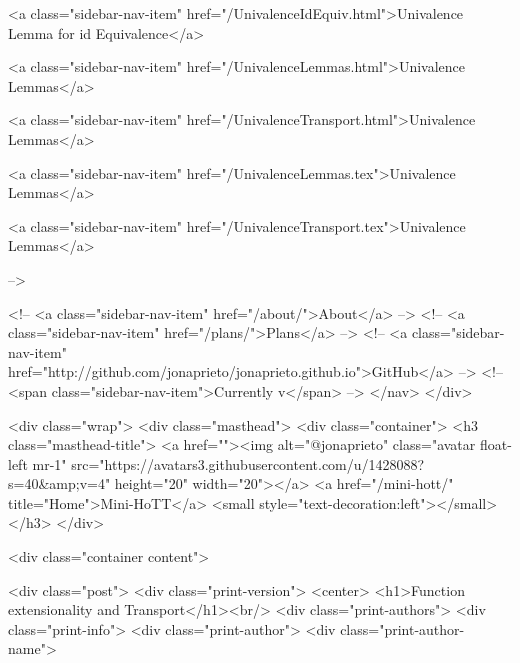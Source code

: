       
    
      
        
          <a class="sidebar-nav-item" href="/UnivalenceIdEquiv.html">Univalence Lemma for id Equivalence</a>
        
      
    
      
        
          <a class="sidebar-nav-item" href="/UnivalenceLemmas.html">Univalence Lemmas</a>
        
      
    
      
        
          <a class="sidebar-nav-item" href="/UnivalenceTransport.html">Univalence Lemmas</a>
        
      
    
      
        
          <a class="sidebar-nav-item" href="/UnivalenceLemmas.tex">Univalence Lemmas</a>
        
      
    
      
        
          <a class="sidebar-nav-item" href="/UnivalenceTransport.tex">Univalence Lemmas</a>
        
      
     -->

    <!-- <a class="sidebar-nav-item" href="/about/">About</a> -->
    <!-- <a class="sidebar-nav-item" href="/plans/">Plans</a> -->
    <!-- <a class="sidebar-nav-item" href="http://github.com/jonaprieto/jonaprieto.github.io">GitHub</a> -->
    <!-- <span class="sidebar-nav-item">Currently v</span> -->
  </nav>
</div>

    <div class="wrap">
      <div class="masthead">
        <div class="container">
          <h3 class="masthead-title">
            <a href=""><img alt="@jonaprieto" class="avatar float-left mr-1" src="https://avatars3.githubusercontent.com/u/1428088?s=40&amp;v=4" height="20" width="20"></a>
            <a href="/mini-hott/" title="Home">Mini-HoTT</a>
            <small style="text-decoration:left"></small>
          </h3>
        </div>
      
      <div class="container content">
        







<div class="post">
  <div class="print-version">
    <center>
      <h1>Function extensionality and Transport</h1><br/>
        <div class="print-authors">
          <div class="print-info">
            <div class="print-author">
              <div class="print-author-name">
                
